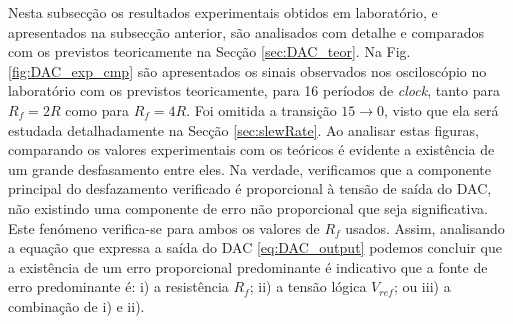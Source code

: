 \documentclass[a4paper, oneside]{article}
\begin{document}
Nesta subsecção os resultados experimentais obtidos em laboratório, e apresentados na subsecção anterior, são analisados com detalhe e comparados com os previstos teoricamente na Secção \ref{sec:DAC_teor}. Na Fig. \ref{fig:DAC_exp_cmp} são apresentados os sinais observados nos osciloscópio no laboratório com os previstos teoricamente, para 16 períodos de \textit{clock}, tanto para $R_f = 2R$ como para $R_f = 4R$. Foi omitida a transição $15\rightarrow 0$, visto que ela será estudada detalhadamente na Secção \ref{sec:slewRate}. Ao analisar estas figuras, comparando os valores experimentais com os teóricos é evidente a existência de um grande desfasamento entre eles. Na verdade, verificamos que a componente principal do desfazamento verificado é proporcional à tensão de saída do DAC, não existindo uma componente de erro não proporcional que seja significativa. Este fenómeno verifica-se para ambos os valores de $R_f$ usados. Assim, analisando a equação que expressa a saída do DAC \eqref{eq:DAC_output} podemos concluir que a existência de um erro proporcional predominante é indicativo que a fonte de erro predominante é: i) a resistência $R_f$; ii) a tensão lógica $V_{ref}$; ou iii) a combinação de i) e ii).
\end{document}
